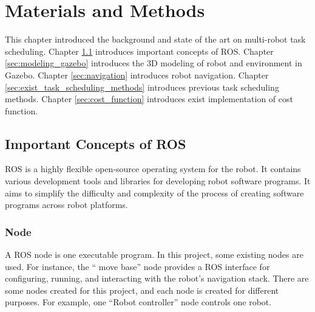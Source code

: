 



\chapter{Materials and Methods}

This chapter introduced the background and state of the art on multi-robot task scheduling. Chapter \ref{sec:ros_concepts} introduces important concepts of ROS. Chapter \ref{sec:modeling_gazebo} introduces the 3D modeling of robot and environment in Gazebo. Chapter \ref{sec:navigation} introduces robot navigation. Chapter \ref{sec:exist_task_scheduling_methods} introduces previous task scheduling methods. Chapter \ref{sec:cost_function} introduces exist implementation of cost function.

\section{Important Concepts of ROS}
\label{sec:ros_concepts}
ROS is a highly flexible open-source operating system for the robot. It contains various development tools and libraries for developing robot software programs\cite{Pyo17}. It aims to simplify the difficulty and complexity of the process of creating software programs across robot platforms.

\subsection{Node}
A ROS node is one executable program. In this project, some existing nodes are used. For instance, the `` move base'' node provides a ROS interface for configuring, running, and interacting with the robot's navigation stack. There are some nodes created for this project, and each node is created for different purposes. For example, one ``Robot controller'' node controls one robot. 


